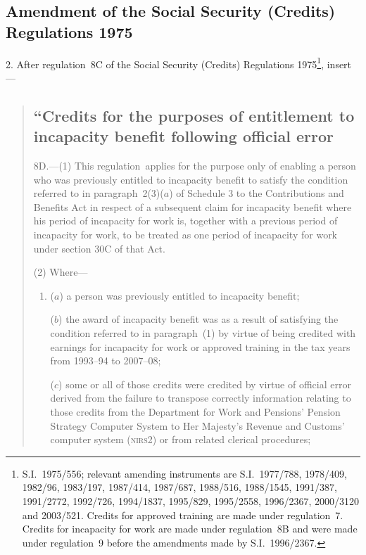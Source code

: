 \documentclass[12pt,a4paper]{article}
\begin{document}
\subsection[2. Amendment of the Social Security (Credits) Regulations 1975]{Amendment of the Social Security (Credits) Regulations 1975}

2.  After regulation~8C of the Social Security (Credits) Regulations 1975\footnote{S.I.~1975/556; relevant amending instruments are S.I.~1977/788, 1978/409, 1982/96, 1983/197, 1987/414, 1987/687, 1988/516, 1988/1545, 1991/387, 1991/2772, 1992/726, 1994/1837, 1995/829, 1995/2558, 1996/2367, 2000/3120 and 2003/521. Credits for approved training are made under regulation~7. Credits for incapacity for work are made under regulation~8B and were made under regulation~9 before the amendments made by S.I.~1996/2367.}, insert—
\begin{quotation}
\subsection*{“Credits for the purposes of entitlement to incapacity benefit following official error}

8D.---(1)  This regulation~applies for the purpose only of enabling a person who was previously entitled to incapacity benefit to satisfy the condition referred to in paragraph~2(3)($a$)  of Schedule 3 to the Contributions and Benefits Act in respect of a subsequent claim for incapacity benefit where his period of incapacity for work is, together with a previous period of incapacity for work, to be treated as one period of incapacity for work under section 30C of that Act.

(2) Where—
\begin{enumerate}\item[]
($a$) a person was previously entitled to incapacity benefit;

($b$) the award of incapacity benefit was as a result of satisfying the condition referred to in paragraph~(1) by virtue of being credited with earnings for incapacity for work or approved training in the tax years from 1993--94 to 2007--08;

($c$) some or all of those credits were credited by virtue of official error derived from the failure to transpose correctly information relating to those credits from the Department for Work and Pensions’ Pension Strategy Computer System to Her Majesty’s Revenue and Customs’ computer system (\lowercase{\textsc{NIRS2}}) or from related clerical procedures;


\end{enumerate}
\end{quotation}
\end{document}
